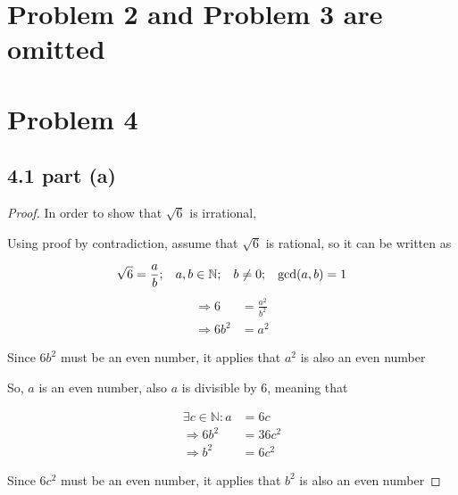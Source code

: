 \documentclass[12pt]{article}
\begin{document}
\newpage
\section*{Problem 2 and Problem 3 are omitted}




\newpage
\section*{Problem 4}

\subsection*{4.1 part (a)}

\begin{proof}
    In order to show that $\sqrt{6}$ is irrational,

    \vspace*{0.3cm}
    \hspace*{1.2cm}
    Using proof by contradiction, assume that $\sqrt{6}$ is rational, so it can be written as

    
    \[ \sqrt{6} = \frac{a}{b}; \hspace*{0.3cm}  a,b \in \mathbb{N};
    \hspace*{0.3cm}   b \neq 0;  \hspace*{0.3cm}  \gcd(a,b) = 1 \]
    \begin{align*}
        \Longrightarrow 6 & = \frac{a^2}{b^2} \\
        \Longrightarrow 6b^2 & = a^2
    \end{align*}

    \hspace*{1.2cm}
    Since $6b^2$ must be an even number, it applies that $a^2$ is also an even number

    
    \vspace*{0.3cm}
    \hspace*{1.2cm}
    So, $a$ is an even number, also $a$ is divisible by 6, meaning that

    \begin{align*}
        \exists c \in \mathbb{N} : a  & = 6c \\
        \Longrightarrow 6b^2  & = 36c^2 \\
        \Longrightarrow b^2 & = 6c^2
    \end{align*}

    \hspace*{1.2cm}
    Since $6c^2$ must be an even number, it applies that $b^2$ is also an even number


\end{proof}
\end{document}
